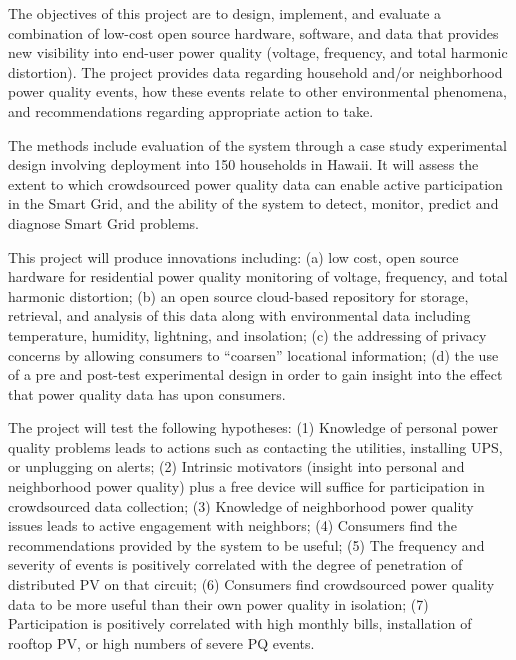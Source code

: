 The objectives of this project are to design, implement, and evaluate a combination of low-cost open source hardware, software, and data that provides new visibility into end-user power quality (voltage, frequency, and total harmonic distortion). The project provides data regarding household and/or neighborhood power quality events, how these events relate to other environmental phenomena, and recommendations regarding appropriate action to take.

The methods include evaluation of the system through a case study experimental design involving deployment into 150 households in Hawaii. It will assess the extent to which crowdsourced power quality data can enable active participation in the Smart Grid, and the ability of the system to detect, monitor, predict and diagnose Smart Grid problems.

\medskip


This project will produce innovations including: (a) low cost, open source hardware for residential power quality monitoring of voltage, frequency, and total harmonic distortion; (b) an open source cloud-based repository for storage, retrieval, and analysis of this data along with environmental data including temperature, humidity, lightning, and insolation; (c) the addressing of privacy concerns by allowing consumers to ``coarsen'' locational information; (d) the use of a pre and post-test experimental design in order to gain insight into the effect that power quality data has upon consumers. 

The project will test the following hypotheses: (1) Knowledge of personal power quality problems leads to actions such as contacting the utilities, installing UPS, or unplugging on alerts; (2) Intrinsic motivators (insight into personal and neighborhood power quality) plus a free device will suffice for participation in crowdsourced data collection; (3) Knowledge of neighborhood power quality issues leads to active engagement with neighbors; (4) Consumers find the recommendations provided by the system to be useful; (5) The frequency and severity of events is positively correlated with the degree of penetration of distributed PV on that circuit; (6) Consumers find crowdsourced power quality data to be more useful than their own power quality in isolation; (7) Participation is positively correlated with high monthly bills, installation of rooftop PV, or high numbers of severe PQ events.


\medskip 

